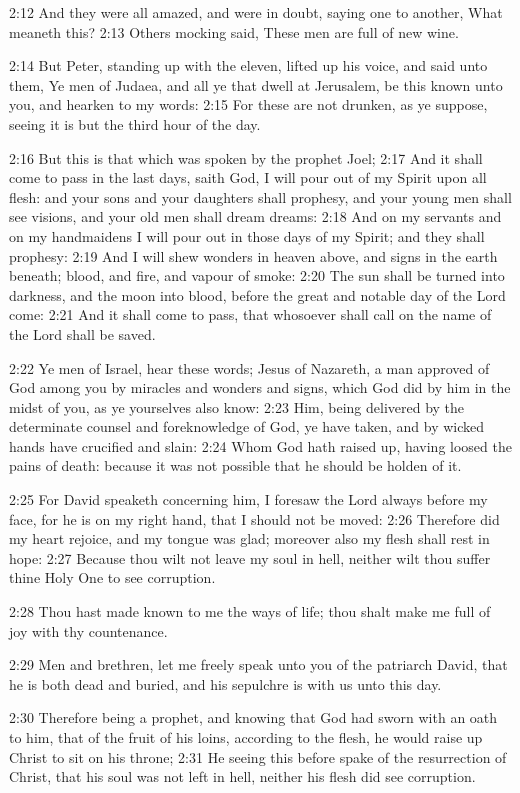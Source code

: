2:12 And they were all amazed, and were in doubt, saying one to
another, What meaneth this?  2:13 Others mocking said, These men are
full of new wine.

2:14 But Peter, standing up with the eleven, lifted up his voice, and
said unto them, Ye men of Judaea, and all ye that dwell at Jerusalem,
be this known unto you, and hearken to my words: 2:15 For these are
not drunken, as ye suppose, seeing it is but the third hour of the
day.

2:16 But this is that which was spoken by the prophet Joel; 2:17 And
it shall come to pass in the last days, saith God, I will pour out of
my Spirit upon all flesh: and your sons and your daughters shall
prophesy, and your young men shall see visions, and your old men shall
dream dreams: 2:18 And on my servants and on my handmaidens I will
pour out in those days of my Spirit; and they shall prophesy: 2:19 And
I will shew wonders in heaven above, and signs in the earth beneath;
blood, and fire, and vapour of smoke: 2:20 The sun shall be turned
into darkness, and the moon into blood, before the great and notable
day of the Lord come: 2:21 And it shall come to pass, that whosoever
shall call on the name of the Lord shall be saved.

2:22 Ye men of Israel, hear these words; Jesus of Nazareth, a man
approved of God among you by miracles and wonders and signs, which God
did by him in the midst of you, as ye yourselves also know: 2:23 Him,
being delivered by the determinate counsel and foreknowledge of God,
ye have taken, and by wicked hands have crucified and slain: 2:24 Whom
God hath raised up, having loosed the pains of death: because it was
not possible that he should be holden of it.

2:25 For David speaketh concerning him, I foresaw the Lord always
before my face, for he is on my right hand, that I should not be
moved: 2:26 Therefore did my heart rejoice, and my tongue was glad;
moreover also my flesh shall rest in hope: 2:27 Because thou wilt not
leave my soul in hell, neither wilt thou suffer thine Holy One to see
corruption.

2:28 Thou hast made known to me the ways of life; thou shalt make me
full of joy with thy countenance.

2:29 Men and brethren, let me freely speak unto you of the patriarch
David, that he is both dead and buried, and his sepulchre is with us
unto this day.

2:30 Therefore being a prophet, and knowing that God had sworn with an
oath to him, that of the fruit of his loins, according to the flesh,
he would raise up Christ to sit on his throne; 2:31 He seeing this
before spake of the resurrection of Christ, that his soul was not left
in hell, neither his flesh did see corruption.

